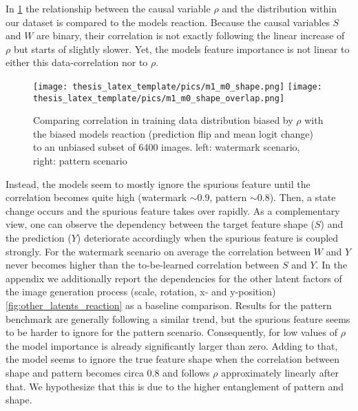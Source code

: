 In \cref{fig:m0_m1} the relationship between the causal variable $\rho$ and the distribution within our dataset is compared to the models reaction. Because the causal variables $S$ and $W$ are binary, their correlation is not exactly following the linear increase of $\rho$ but starts of slightly slower. Yet, the models feature importance is not linear to either this data-correlation nor to $\rho$.

\begin{figure}[t!]
\centering
    \texttt{[image: thesis\_latex\_template/pics/m1\_m0\_shape.png]}
    \texttt{[image: thesis\_latex\_template/pics/m1\_m0\_shape\_overlap.png]}
    \caption[$m_0$ vs. $m_1$]{Comparing correlation in training data distribution biased by $\rho$ with the biased models reaction (prediction flip and mean logit change) to an unbiased subset of 6400 images. left: watermark scenario, right: pattern scenario }
    \label{fig:m0_m1}
\end{figure}

Instead, the models seem to mostly ignore the spurious feature until the correlation becomes quite high (watermark $\sim 0.9$, pattern $\sim 0.8$). Then, a state change  occurs and the spurious feature takes over rapidly. As a complementary view, one can observe the dependency between the target feature shape ($S$) and the prediction ($Y$) deteriorate accordingly when the spurious feature is coupled strongly. For the watermark scenario on average the correlation between $W$ and $Y$ never becomes higher than the to-be-learned correlation between $S$ and $Y$. In the appendix we additionally report the dependencies for the other latent factors of the image generation process (scale, rotation, x- and y-position) \cref{fig:other_latents_reaction} as a baseline comparison.
Results for the pattern benchmark are generally following a similar trend, but the spurious feature seems to be harder to ignore for the pattern scenario. Consequently, for low values of $\rho$ the model importance is already significantly larger than zero. Adding to that, the model seems to ignore the true feature shape when the correlation between shape and pattern becomes circa 0.8 and follows $\rho$ approximately linearly after that. We hypothesize that this is due to the higher entanglement of pattern and shape. 

